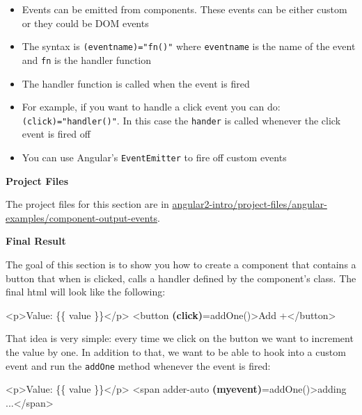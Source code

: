 \documentclass[12pt,]{article}
\newenvironment{Shaded}{}{}
\newcommand{\KeywordTok}[1]{\textcolor[rgb]{0.00,0.00,1.00}{{#1}}}
\newcommand{\StringTok}[1]{\textcolor[rgb]{0.00,0.50,0.50}{{#1}}}
\newcommand{\OtherTok}[1]{\textcolor[rgb]{1.00,0.25,0.00}{{#1}}}
\newcommand{\ErrorTok}[1]{\textcolor[rgb]{1.00,0.00,0.00}{\textbf{{#1}}}}
\newcommand{\NormalTok}[1]{{#1}}
\providecommand{\tightlist}{%
  \setlength{\itemsep}{0pt}\setlength{\parskip}{0pt}}
\begin{document}
\begin{itemize}
\tightlist
\item
  Events can be emitted from components. These events can be either
  custom or they could be DOM events
\item
  The syntax is \texttt{(eventname)="fn()"} where \texttt{eventname} is
  the name of the event and \texttt{fn} is the handler function
\item
  The handler function is called when the event is fired
\item
  For example, if you want to handle a click event you can do:
  \texttt{(click)="handler()"}. In this case the \texttt{hander} is
  called whenever the click event is fired off
\item
  You can use Angular's \texttt{EventEmitter} to fire off custom events
\end{itemize}

\textbf{Project Files}

The project files for this section are in
\href{https://github.com/st32lth/angular2-intro/tree/master/project-files/angular-examples/component-output-events}{angular2-intro/project-files/angular-examples/component-output-events}.

\textbf{Final Result}

The goal of this section is to show you how to create a component that
contains a button that when is clicked, calls a handler defined by the
component's class. The final html will look like the following:

\begin{Shaded}
\begin{Highlighting}[numbers=left,,]
\KeywordTok{<p>}\NormalTok{Value: \{\{ value \}\}}\KeywordTok{</p>}
\KeywordTok{<button} \ErrorTok{(click)}\OtherTok{=}\StringTok{addOne()}\KeywordTok{>}\NormalTok{Add +}\KeywordTok{</button>}
\end{Highlighting}
\end{Shaded}

That idea is very simple: every time we click on the button we want to
increment the value by one. In addition to that, we want to be able to
hook into a custom event and run the \texttt{addOne} method whenever the
event is fired:

\begin{Shaded}
\begin{Highlighting}[numbers=left,,]
\KeywordTok{<p>}\NormalTok{Value: \{\{ value \}\}}\KeywordTok{</p>}
\KeywordTok{<span}\OtherTok{ adder-auto} \ErrorTok{(myevent)}\OtherTok{=}\StringTok{addOne()}\KeywordTok{>}\NormalTok{adding ...}\KeywordTok{</span>}
\end{Highlighting}
\end{Shaded}
\end{document}
